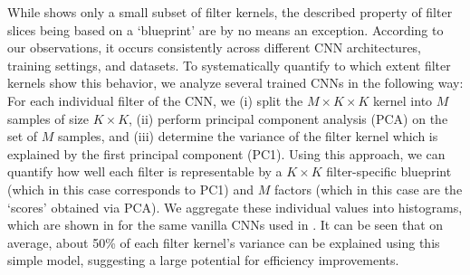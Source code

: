 \documentclass[10pt,twocolumn,letterpaper]{article}
\newcommand{\spatialK}{K}
\newcommand{\channelInCount}{M}
\begin{document}
While  shows only a small subset of filter kernels, the described property of filter slices being based on a `blueprint' are by no means an exception.
According to our observations, it occurs consistently across different CNN architectures, training settings, and datasets.
To systematically quantify to which extent filter kernels show this behavior, we analyze several trained CNNs in the following way:
For each individual filter of the CNN, we
(i) split the $\channelInCount \times \spatialK \times \spatialK$ kernel into $\channelInCount$ samples of size $\spatialK \times \spatialK$,
(ii) perform principal component analysis (PCA) on the set of $\channelInCount$ samples, and
(iii) determine the variance of the filter kernel which is explained by the first principal component (PC1).
Using this approach, we can quantify how well each filter is representable by a $\spatialK \times \spatialK$ filter-specific blueprint (which in this case corresponds to PC1) and $\channelInCount$ factors (which in this case are the `scores' obtained via PCA).
We aggregate these individual values into histograms, which are shown in  for the same vanilla CNNs used in .
It can be seen that on average, about 50\% of each filter kernel's variance can be explained using this simple model, suggesting a large potential for efficiency improvements.
\end{document}
